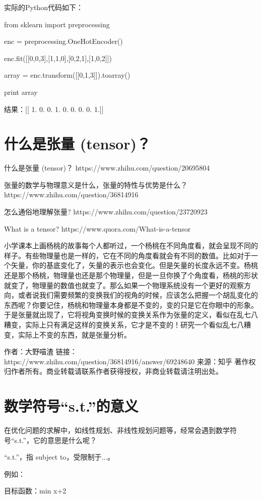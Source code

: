 \documentclass[UTF8]{ctexbook}
\begin{document}
实际的Python代码如下：

from sklearn import preprocessing

enc = preprocessing.OneHotEncoder()

enc.fit([[0,0,3],[1,1,0],[0,2,1],[1,0,2]])

array = enc.transform([[0,1,3]]).toarray()

print array

结果：[[ 1.  0.  0.  1.  0.  0.  0.  0.  1.]]

\section{什么是张量 (tensor)？}
什么是张量 (tensor)？ https://www.zhihu.com/question/20695804

张量的数学与物理意义是什么，张量的特性与优势是什么？ https://www.zhihu.com/question/36814916

怎么通俗地理解张量? https://www.zhihu.com/question/23720923

What is a tensor? https://www.quora.com/What-is-a-tensor


小学课本上画杨桃的故事每个人都听过，一个杨桃在不同角度看，就会呈现不同的样子。有些物理量也是一样的，它在不同的角度看就会有不同的数值。比如对于一个矢量，你的基底变化了，矢量的表示也会变化。但是矢量的长度永远不变。杨桃还是那个杨桃，物理量也还是那个物理量，但是一旦你换了个角度看，杨桃的形状就变了，物理量的数值也就变了。那么如果一个物理系统没有一个更好的观察方向，或者说我们需要频繁的变换我们的视角的时候，应该怎么把握一个胡乱变化的东西呢？你要记住，杨桃和物理量本身都是不变的，变的只是它在你眼中的形象。于是张量就出现了，它将视角变换时候的变换关系作为张量的定义，看似在乱七八糟变，实际上只有满足这样的变换关系，它才是不变的！研究一个看似乱七八糟变，实际上不变的东西，就是张量分析。

作者：大野喵渣
链接：https://www.zhihu.com/question/36814916/answer/69248640
来源：知乎
著作权归作者所有。商业转载请联系作者获得授权，非商业转载请注明出处。

\section{数学符号“s.t.”的意义}

在优化问题的求解中，如线性规划、非线性规划问题等，经常会遇到数学符号“s.t.”，它的意思是什么呢？

“s.t.”，指 subject to，受限制于...。

例如：

                目标函数：min {x+2}
\end{document}

